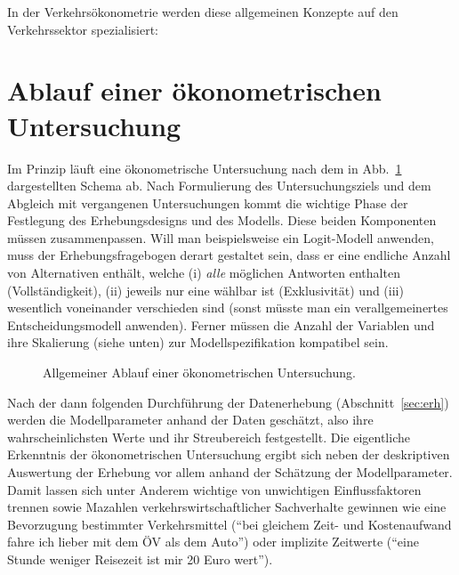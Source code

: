 
In der Verkehrs\"okonometrie werden diese allgemeinen
Konzepte auf den
Verkehrssektor spezialisiert:


\section{\label{sec:oekonAblauf}Ablauf einer \"okonometrischen Untersuchung}

Im Prinzip l\"auft eine \"okonometrische Untersuchung nach dem in
Abb.~\ref{fig:flussdiag-komplett} dargestellten Schema ab. Nach
Formulierung des Untersuchungsziels und dem Abgleich mit vergangenen
Untersuchungen kommt die wichtige Phase der Festlegung des
Erhebungsdesigns und des Modells. Diese beiden Komponenten m\"ussen
zusammenpassen. Will man beispielsweise ein Logit-Modell anwenden,
muss der Erhebungsfragebogen derart gestaltet sein, dass er eine
endliche Anzahl von Alternativen enth\"alt, welche (i)  \emph{alle}
m\"oglichen Antworten enthalten (Vollst\"andigkeit), (ii) jeweils nur
eine w\"ahlbar ist (Exklusivit\"at) und (iii) wesentlich voneinander
verschieden sind (sonst m\"usste man ein verallgemeinertes
Entscheidungsmodell anwenden). Ferner m\"ussen die Anzahl der
Variablen und ihre Skalierung (siehe 
unten) zur Modellspezifikation kompatibel sein. 

\begin{figure}
\caption{\label{fig:flussdiag-komplett}Allgemeiner
Ablauf einer \"okonometrischen 
Untersuchung.
}
\end{figure}

Nach der dann folgenden Durchf\"uhrung der Datenerhebung
(Abschnitt~\ref{sec:erh}) werden die Modellparameter anhand der Daten
gesch\"atzt, also ihre wahrscheinlichsten Werte und ihr Streubereich
festgestellt. Die eigentliche Erkenntnis der \"okonometrischen
Untersuchung ergibt sich neben der deskriptiven Auswertung der
Erhebung vor allem anhand der Sch\"atzung der Modellparameter. Damit
lassen sich unter Anderem wichtige von unwichtigen Einflussfaktoren
trennen sowie Ma\3zahlen verkehrswirtschaftlicher Sachverhalte
gewinnen wie eine Bevorzugung bestimmter Verkehrsmittel (``bei
gleichem Zeit- und Kostenaufwand fahre ich lieber mit dem \"OV als dem
Auto'') oder implizite
Zeitwerte (``eine Stunde weniger Reisezeit ist mir 20 Euro wert''). 

